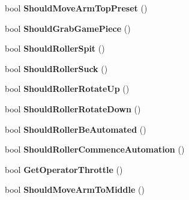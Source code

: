 \begin{DoxyCompactItemize}
\item 
\hypertarget{class_processed_inputs_aa8f3de3748176b1ab247a6cc2ec62ff2}{
bool {\bfseries \-Should\-Move\-Arm\-Top\-Preset} ()}
\label{class_processed_inputs_aa8f3de3748176b1ab247a6cc2ec62ff2}

\item 
\hypertarget{class_processed_inputs_ae444857a1945aa8062e4a20a8b38c4e4}{
bool {\bfseries \-Should\-Grab\-Game\-Piece} ()}
\label{class_processed_inputs_ae444857a1945aa8062e4a20a8b38c4e4}

\item 
\hypertarget{class_processed_inputs_a4dfc7b695ef616c4b5114fff6568338e}{
bool {\bfseries \-Should\-Roller\-Spit} ()}
\label{class_processed_inputs_a4dfc7b695ef616c4b5114fff6568338e}

\item 
\hypertarget{class_processed_inputs_abf8713cb78da57ed9368f9cdea8901d0}{
bool {\bfseries \-Should\-Roller\-Suck} ()}
\label{class_processed_inputs_abf8713cb78da57ed9368f9cdea8901d0}

\item 
\hypertarget{class_processed_inputs_a8267cc7fe7ddf3104a2b89966ba5bc3f}{
bool {\bfseries \-Should\-Roller\-Rotate\-Up} ()}
\label{class_processed_inputs_a8267cc7fe7ddf3104a2b89966ba5bc3f}

\item 
\hypertarget{class_processed_inputs_a03193fbd8fa1e18266aa19ed11d7b3bf}{
bool {\bfseries \-Should\-Roller\-Rotate\-Down} ()}
\label{class_processed_inputs_a03193fbd8fa1e18266aa19ed11d7b3bf}

\item 
\hypertarget{class_processed_inputs_a8eccd609c9c153ac8ca02a9913d967e6}{
bool {\bfseries \-Should\-Roller\-Be\-Automated} ()}
\label{class_processed_inputs_a8eccd609c9c153ac8ca02a9913d967e6}

\item 
\hypertarget{class_processed_inputs_a7193690108b6c582ae2a3bb1a0be0fbe}{
bool {\bfseries \-Should\-Roller\-Commence\-Automation} ()}
\label{class_processed_inputs_a7193690108b6c582ae2a3bb1a0be0fbe}

\item 
\hypertarget{class_processed_inputs_a988f17919ab291a5e4402b4815fc68f1}{
bool {\bfseries \-Get\-Operator\-Throttle} ()}
\label{class_processed_inputs_a988f17919ab291a5e4402b4815fc68f1}

\item 
\hypertarget{class_processed_inputs_ac5922323be2be1cd5d1c2fccc8eb531e}{
bool {\bfseries \-Should\-Move\-Arm\-To\-Middle} ()}
\label{class_processed_inputs_ac5922323be2be1cd5d1c2fccc8eb531e}


\end{DoxyCompactItemize}
